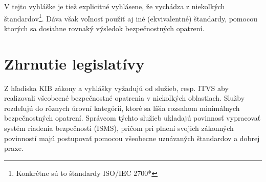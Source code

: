V tejto vyhláške je tiež explicitné vyhlásene, že vychádza z niekoľkých štandardov\footnote{ Konkrétne sú to štandardy 
ISO/IEC 2700*}. Dáva však voľnosť použiť aj iné (ekvivalentné) štandardy, pomocou ktorých sa dosiahne rovnaký výsledok 
bezpečnostných opatrení.

\section{Zhrnutie legislatívy}
Z hľadiska KIB zákony a vyhlášky vyžadujú od služieb, resp. ITVS aby realizovali všeobecné bezpečnostné opatrenia v
niekoľkých oblastiach. Služby rozdeľujú do rôznych úrovní kategórií, ktoré sa líšia rozsahom minimálnych 
bezpečnostných opatrení. Správcom týchto služieb ukladajú povinnosť vypracovať systém riadenia bezpečnosti (ISMS), 
pričom pri plnení svojich zákonných povinností majú postupovať pomocou všeobecne uznávaných štandardov a dobrej praxe.
